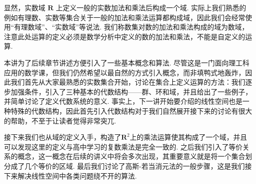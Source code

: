 显然，实数域 $\mathbf{R}$ 上定义一般的实数加法和乘法后构成一个域. 实际上我们熟悉的例如有理数、实数等集合关于一般的加法和乘法运算都构成域，因此我们会经常使用``有理数域''、``实数域''等说法. 我们称数集对数的加法和乘法构成的域为数域，注意此处运算的定义必须是数学分析中定义的数的加法和乘法，不能是自定义的运算.


\begin{summary}

    本讲为了后续章节讲述方便引入了一些基本概念和算法. 尽管这是一门面向理工科应用的数学课，但我们仍然希望以最自然的方式引入概念，而非填鸭式地轰炸，因此我们首先从大家最熟悉的实数集合开始，讨论在集合上定义运算的方法：我们逐步加强条件，引入了三种基本的代数结构——群、环和域，并且给出了一些例子，并简单讨论了定义代数系统的意义. 事实上，下一讲开始要介绍的线性空间也是一种特殊的代数结构，因此首先引入代数结构对于我们自然展开接下来的讨论有很大的帮助，不至于让读者觉得非常突兀.

    接下来我们也从域的定义入手，构造了$\mathbf{R}^2$上的乘法运算使其构成了一个域，并且可以发现这里的定义与高中学习的复数乘法是完全一致的. 之后我们引入了等价关系的概念，这一概念在后续的讲义中将会多次出现，其重要意义就是将一个集合划分成了几个等价的区域. 最后我们讨论了高斯-若当消元法的一般步骤，这是我们接下来解决线性空间中各类问题绕不开的算法.

\end{summary}
